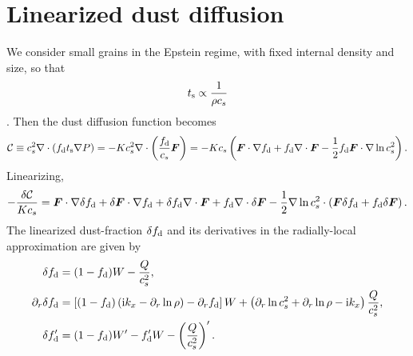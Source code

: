 \section{Linearized dust diffusion}\label{lin_dust}
We consider small grains in the Epstein regime, with fixed internal
density and size, so that
\begin{align}
  t_\mathrm{s}  \propto  \frac{1}{\rho c_s}\label{epstein}
\end{align}
\citep{price15}. Then the dust diffusion
function becomes
\begin{align}
  \mathcal{C} \equiv c_s^2\nabla\cdot\left(f_\mathrm{d}t_\mathrm{s}\nabla
  P\right) = - K c_s^2 \nabla\cdot
  \left(\frac{f_\mathrm{d}}{c_s}\bm{F}\right) =
  -Kc_s \left(\bm{F}\cdot\nabla f_\mathrm{d} + f_\mathrm{d} \nabla\cdot\bm{F}
  - \frac{1}{2}f_\mathrm{d}\bm{F}\cdot\nabla\ln{c_s^2}\right).  
\end{align}
Linearizing,
\begin{align}
  - \frac{\delta\mathcal{C}}{Kc_s} = \bm{F}\cdot\nabla\delta f_\mathrm{d} +
  \delta\bm{F}\cdot\nabla f_\mathrm{d} + \delta f_\mathrm{d}\nabla\cdot\bm{F} +
  f_\mathrm{d}\nabla\cdot\delta\bm{F} -
  \frac{1}{2}\nabla\ln{c_s^2}\cdot\left(\bm{F}\delta f_\mathrm{d} + f_\mathrm{d}
  \delta\bm{F}\right). 
\end{align}
The linearized dust-fraction $\delta f_\mathrm{d}$ and its derivatives in the
radially-local approximation are given by
\begin{align}
  \delta f_\mathrm{d}      &= (1-f_\mathrm{d})W - \frac{Q}{c_s^2}, \\
  \partial_r\delta f_\mathrm{d} &= \left[(1-f_\mathrm{d})\left(\mathrm{i} k_x -
    \partial_r\ln{\rho}\right) - \partial_rf_\mathrm{d}\right]W + \left(\partial_r\ln{c_s^2}
  + \partial_r\ln{\rho} - \mathrm{i} k_x \right)\frac{Q}{c_s^2},\\
  \delta f_\mathrm{d}^\prime &= (1-f_\mathrm{d})W^\prime - f_\mathrm{d}^\prime W -
  \left(\frac{Q}{c_s^2}\right)^\prime. 
\end{align}



